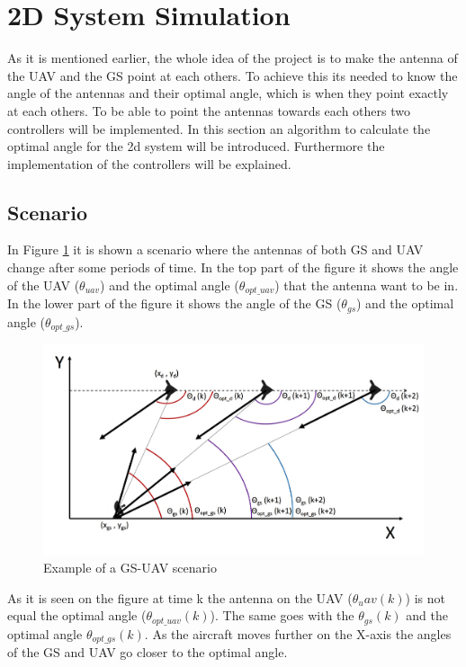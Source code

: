 \newpage
\section{2D System Simulation}\label{sec:2d_sim}
As it is mentioned earlier, the whole idea of the project is to make the antenna of the UAV and the GS point at each others. To achieve this its needed to know the angle of the antennas and their optimal angle, which is when they point exactly at each others. To be able to point the antennas towards each others two controllers will be implemented. In this section an algorithm to calculate the optimal angle for the 2d system will be introduced. Furthermore the implementation of the controllers will be explained.
\subsection{Scenario}
In Figure \ref{fig:uav_gs} it is shown a scenario where the antennas of both GS and UAV change after some periods of time. In the top part of the figure it shows the angle of the UAV ($\theta_{uav}$) and the optimal angle ($\theta_{opt\_uav}$) that the antenna want to be in. In the lower part of the figure it shows the angle of the GS ($\theta_{gs}$) and the optimal angle ($\theta_{opt\_gs}$). 

\begin{figure}[h]
	\centering
	
	\includegraphics[scale=0.45]{figures/drone_gs_ex_1.jpg}
	\caption{Example of a GS-UAV scenario}
	\label{fig:uav_gs}
\end{figure}

As it is seen on the figure at time k the antenna on the UAV ($\theta_uav (k)$) is not equal the optimal angle ($\theta_{opt\_uav}(k)$). The same goes with the $\theta_{gs}(k)$ and the optimal angle $\theta_{opt\_gs}(k)$. As the aircraft moves further on the X-axis the angles of the GS and UAV go closer to the optimal angle. 

